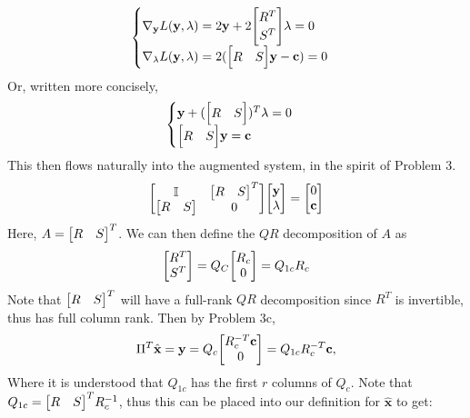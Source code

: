 \begin{solution}
\[
\begin{cases}
    \nabla_\textbf{y} L(\textbf{y}, \lm) = 2\textbf{y} + 2\mqty[R^T\\S^T]\lm = 0\\
    \nabla_\lm L(\textbf{y}, \lm) = 2(\mqty[R&S]\textbf{y} - \textbf{c}) = 0
\end{cases}
\]
Or, written more concisely,
\[
\begin{cases}
    \textbf{y} + (\mqty[R&S])^T\lm = 0\\
    \mqty[R&S]\textbf{y} = \textbf{c}
\end{cases}
\]
This then flows naturally into the augmented system, in the spirit of Problem 3. 
\[
\mqty[\id &\mqty[R&S]^T\\\mqty[R&S] &0]\mqty[\textbf{y}\\\lm] = \mqty[0\\\textbf{c}]
\]
Here, $A = \mqty[R&S]^T$. We can then define the $QR$ decomposition of $A$ as
\[
\mqty[R^T\\S^T] = Q_C\mqty[R_c\\0] = Q_{1c}R_c
\]
Note that $\mqty[R&S]^T$ will have a full-rank $QR$ decomposition since $R^T$ is invertible, thus has full column rank. Then by Problem 3c,
\[
\Pi^T\hat{\textbf{x}} = \textbf{y} = Q_c\mqty[R_c^{-T}\textbf{c}\\0] = Q_{1c}R_c^{-T}\textbf{c},
\]
Where it is understood that $Q_{1c}$ has the first $r$ columns of $Q_c$. Note that $Q_{1c} = \mqty[R&S]^TR_c^\inv$, thus this can be placed into our definition for $\hat{\textbf{x}}$ to get:


\end{solution}
